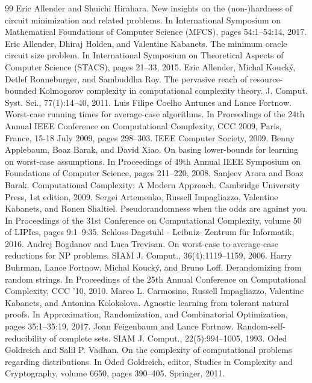 \documentclass[10pt,a4paper]{article}
\begin{document}
\begin{thebibliography}{99}
 Eric Allender and Shuichi Hirahara. New insights on the (non-)hardness of circuit minimization and related problems. In International Symposium on Mathematical Foundations of Computer Science (MFCS), pages 54:1–54:14, 2017.
 Eric Allender, Dhiraj Holden, and Valentine Kabanets. The minimum oracle circuit size problem. In International Symposium on Theoretical Aspects of Computer Science (STACS), pages 21–33, 2015.
 Eric Allender, Michal Koucký, Detlef Ronneburger, and Sambuddha Roy. The pervasive reach of resource-bounded Kolmogorov complexity in computational complexity theory. J. Comput. Syst. Sci., 77(1):14–40, 2011.
 Luis Filipe Coelho Antunes and Lance Fortnow. Worst-case running times for average-case algorithms. In Proceedings of the 24th Annual IEEE Conference on Computational Complexity, CCC 2009, Paris, France, 15-18 July 2009, pages 298–303. IEEE Computer Society, 2009.
 Benny Applebaum, Boaz Barak, and David Xiao. On basing lower-bounds for learning on worst-case assumptions. In Proceedings of 49th Annual IEEE Symposium on Foundations of Computer Science, pages 211–220, 2008.
 Sanjeev Arora and Boaz Barak. Computational Complexity: A Modern Approach. Cambridge University Press, 1st edition, 2009.
 Sergei Artemenko, Russell Impagliazzo, Valentine Kabanets, and Ronen Shaltiel. Pseudorandomness when the odds are against you. In Proceedings of the 31st Conference on Computational Complexity, volume 50 of LIPIcs, pages 9:1–9:35. Schloss Dagstuhl - Leibniz- Zentrum für Informatik, 2016.
 Andrej Bogdanov and Luca Trevisan. On worst-case to average-case reductions for NP problems. SIAM J. Comput., 36(4):1119–1159, 2006.
 Harry Buhrman, Lance Fortnow, Michal Koucký, and Bruno Loff. Derandomizing from random strings. In Proceedings of the 25th Annual Conference on Computational Complexity, CCC ’10, 2010.
 Marco L. Carmosino, Russell Impagliazzo, Valentine Kabanets, and Antonina Kolokolova. Agnostic learning from tolerant natural proofs. In Approximation, Randomization, and Combinatorial Optimization, pages 35:1–35:19, 2017.
 Joan Feigenbaum and Lance Fortnow. Random-self-reducibility of complete sets. SIAM J. Comput., 22(5):994–1005, 1993.
 Oded Goldreich and Salil P. Vadhan. On the complexity of computational problems regarding distributions. In Oded Goldreich, editor, Studies in Complexity and Cryptography, volume 6650, pages 390–405. Springer, 2011.

\end{thebibliography}
\end{document}

